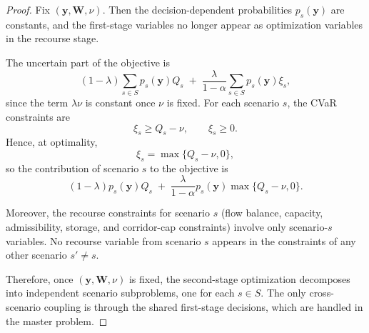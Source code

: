 \documentclass[10pt,a4paper]{amsart}
\begin{document}
\begin{proof}
Fix $(\mathbf{y}, \mathbf{W}, \nu)$. Then the decision-dependent
probabilities $p_s(\mathbf{y})$ are constants, and the first-stage
variables no longer appear as optimization variables in the recourse
stage.

The uncertain part of the objective is
\[
(1-\lambda)\sum_{s\in S} p_s(\mathbf{y}) Q_s
\;+\;
\frac{\lambda}{1-\alpha}\sum_{s\in S} p_s(\mathbf{y}) \xi_s,
\]
since the term $\lambda \nu$ is constant once $\nu$ is fixed. For each
scenario $s$, the CVaR constraints are
\[
\xi_s \ge Q_s - \nu, \qquad \xi_s \ge 0.
\]
Hence, at optimality,
\[
\xi_s = \max\{Q_s-\nu,0\},
\]
so the contribution of scenario $s$ to the objective is
\[
(1-\lambda)p_s(\mathbf{y})Q_s
\;+\;
\frac{\lambda}{1-\alpha}p_s(\mathbf{y})\max\{Q_s-\nu,0\}.
\]

Moreover, the recourse constraints for scenario $s$ (flow balance,
capacity, admissibility, storage, and corridor-cap constraints) involve
only scenario-$s$ variables. No recourse variable from scenario $s$ appears
in the constraints of any other scenario $s' \neq s$.

Therefore, once $(\mathbf{y}, \mathbf{W}, \nu)$ is fixed, the second-stage
optimization decomposes into independent scenario subproblems, one for
each $s \in S$. The only cross-scenario coupling is through the shared
first-stage decisions, which are handled in the master problem.
\end{proof}
\end{document}
